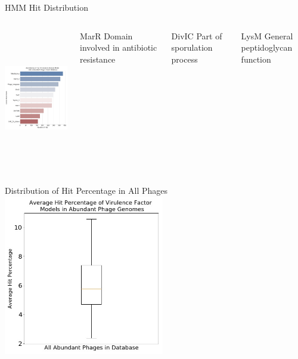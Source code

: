 \documentclass[11pt, xcolor=table]{beamer}
\begin{document}
	
	\begin{frame}{HMM Hit Distribution}
	\begin{columns}
	\includegraphics[height=6cm, width=6cm]{Abundant_Phages_HMM_ID.jpg}
	\begin{block}{MarR}
	Domain involved in antibiotic resistance
	\end{block}
	\begin{block}{DivIC}
	Part of sporulation process
	\end{block}
	\begin{block}{LysM}
	General peptidoglycan function
	\end{block}
	\end{columns}
	\end{frame}
	
	\begin{frame}{Distribution of Hit Percentage in All Phages}
	\centering
	\includegraphics[height=7cm, width=7cm]{Abundant_Phages_Percentage.jpg}
	
	\end{frame}
	
\end{document}
